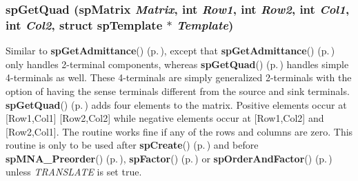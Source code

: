 \subsubsection{ sp\-Get\-Quad ({\bf sp\-Matrix} {\em Matrix}, int {\em Row1}, int {\em Row2}, int {\em Col1}, int {\em Col2}, struct {\bf sp\-Template} $\ast$ {\em Template})}\label{spBuild_8c_a14}


Similar to {\bf sp\-Get\-Admittance}() {\rm (p.\,\pageref{spBuild_8c_a13})}, except that {\bf sp\-Get\-Admittance}() {\rm (p.\,\pageref{spBuild_8c_a13})} only handles 2-terminal components, whereas {\bf sp\-Get\-Quad}() {\rm (p.\,\pageref{spBuild_8c_a14})} handles simple 4-terminals as well. These 4-terminals are simply generalized 2-terminals with the option of having the sense terminals different from the source and sink terminals. {\bf sp\-Get\-Quad}() {\rm (p.\,\pageref{spBuild_8c_a14})} adds four elements to the matrix. Positive elements occur at [Row1,Col1] [Row2,Col2] while negative elements occur at [Row1,Col2] and [Row2,Col1]. The routine works fine if any of the rows and columns are zero. This routine is only to be used after {\bf sp\-Create}() {\rm (p.\,\pageref{spAllocate_8c_a11})} and before {\bf sp\-MNA\_\-Preorder}() {\rm (p.\,\pageref{spUtils_8c_a11})}, {\bf sp\-Factor}() {\rm (p.\,\pageref{spFactor_8c_a25})} or {\bf sp\-Order\-And\-Factor}() {\rm (p.\,\pageref{spFactor_8c_a24})} unless {\em TRANSLATE} is set true.

